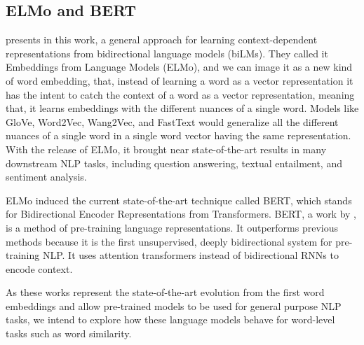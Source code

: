 \subsection{ELMo and BERT}

 presents in this work, a general approach for learning context-dependent representations from bidirectional language models (biLMs). They called it Embeddings from Language Models (ELMo), and we can image it as a new kind of word embedding, that, instead of learning a word as a vector representation it has the intent to catch the context of a word as a vector representation, meaning that, it learns embeddings with the different nuances of a single word. Models like GloVe, Word2Vec, Wang2Vec, and FastText would generalize all the different nuances of a single word in a single word vector having the same representation. With the release of ELMo, it brought near state-of-the-art results in many downstream NLP tasks,  including question answering, textual entailment, and sentiment analysis.

ELMo induced the current state-of-the-art technique called BERT, which stands for Bidirectional Encoder Representations from Transformers.  
BERT, a work by , is a method of pre-training language representations. It outperforms previous methods because it is the first unsupervised, deeply bidirectional system for pre-training NLP. It uses attention transformers instead of bidirectional RNNs to encode context.

As these works represent the state-of-the-art evolution from the first word embeddings and allow pre-trained models to be used for general purpose NLP tasks, we intend to explore how these language models behave for word-level tasks such as word similarity. 
